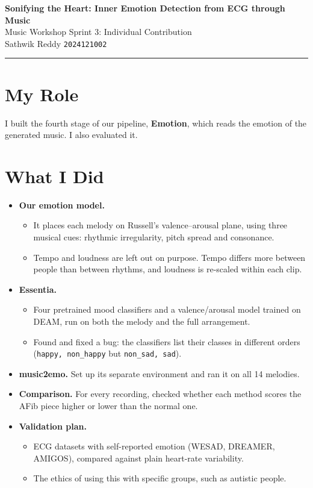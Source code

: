 \documentclass[11pt,a4paper]{article}
\begin{document}
\begin{center}
  {\Large\bfseries Sonifying the Heart: Inner Emotion Detection from ECG through Music}\\[6pt]
  Music Workshop Sprint 3: Individual Contribution\\[8pt]
  {\large Sathwik Reddy} \quad \texttt{2024121002}
\end{center}
\noindent\rule{\textwidth}{0.4pt}

\section{My Role}
I built the fourth stage of our pipeline, \textbf{Emotion}, which reads the emotion of the
generated music. I also evaluated it.

\section{What I Did}
\begin{itemize}
  \item \textbf{Our emotion model.}
    \begin{itemize}
      \item It places each melody on Russell's valence--arousal plane, using three musical cues:
        rhythmic irregularity, pitch spread and consonance.
      \item Tempo and loudness are left out on purpose. Tempo differs more between people than
        between rhythms, and loudness is re-scaled within each clip.
    \end{itemize}
  \item \textbf{Essentia.}
    \begin{itemize}
      \item Four pretrained mood classifiers and a valence/arousal model trained on DEAM, run on
        both the melody and the full arrangement.
      \item Found and fixed a bug: the classifiers list their classes in different orders
        (\texttt{happy, non\_happy} but \texttt{non\_sad, sad}).
    \end{itemize}
  \item \textbf{music2emo.} Set up its separate environment and ran it on all 14 melodies.
  \item \textbf{Comparison.} For every recording, checked whether each method scores the AFib
    piece higher or lower than the normal one.
  \item \textbf{Validation plan.}
    \begin{itemize}
      \item ECG datasets with self-reported emotion (WESAD, DREAMER, AMIGOS), compared against
        plain heart-rate variability.
      \item The ethics of using this with specific groups, such as autistic people.
    \end{itemize}
\end{itemize}
\end{document}
